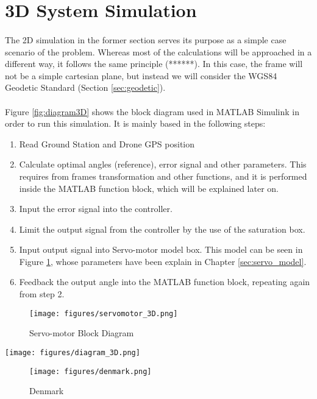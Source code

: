 \section{3D System Simulation}\label{sec:3d_sim}

\paragraph{}The 2D simulation in the former section serves its purpose as a simple case scenario of the problem. Whereas most of the calculations will be approached in a different way, it follows the same principle (******).
In this case, the frame will not be a simple cartesian plane, but instead we will consider the WGS84 Geodetic Standard (Section \ref{sec:geodetic}).


\paragraph{} Figure \ref{fig:diagram3D} shows the block diagram used in MATLAB Simulink in order to run this simulation. It is mainly based in the following steps:
\begin{enumerate}
\item{Read Ground Station and Drone GPS position}
\item{Calculate optimal angles (reference), error signal and other parameters. This requires from frames transformation and other functions, and it is performed inside the MATLAB function block, which will be explained later on.}
\item{Input the error signal into the controller.}
\item{Limit the output signal from the controller by the use of the saturation box.}
\item{Input output signal into Servo-motor model box. This model can be seen in Figure \ref{fig:servomotor3D}, whose parameters have been explain in Chapter \ref{sec:servo_model}.}
\item{Feedback the output angle into the MATLAB function block, repeating again from step 2.}
\end{enumerate}

\begin{figure}[h]
	\centering
	\texttt{[image: figures/servomotor\_3D.png]}
	\caption{Servo-motor Block Diagram}
   	\label{fig:servomotor3D}
\end{figure}

\begin{sidewaysfigure}
	\centering
	\texttt{[image: figures/diagram\_3D.png]}
	\caption{Block Diagram for 3D Simulation}
   	\label{fig:diagram3D}
\end{sidewaysfigure}

\begin{figure}[h]
	\centering
	\texttt{[image: figures/denmark.png]}
	\caption{Denmark}
   	\label{fig:denmark}
\end{figure}

